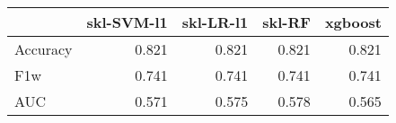 \begin{tabular}{lrrrr}
\toprule
{} &  skl-SVM-l1 &  skl-LR-l1 &  skl-RF &  xgboost \\
\midrule
Accuracy &       0.821 &      0.821 &   0.821 &    0.821 \\
F1w      &       0.741 &      0.741 &   0.741 &    0.741 \\
AUC      &       0.571 &      0.575 &   0.578 &    0.565 \\
\bottomrule
\end{tabular}
